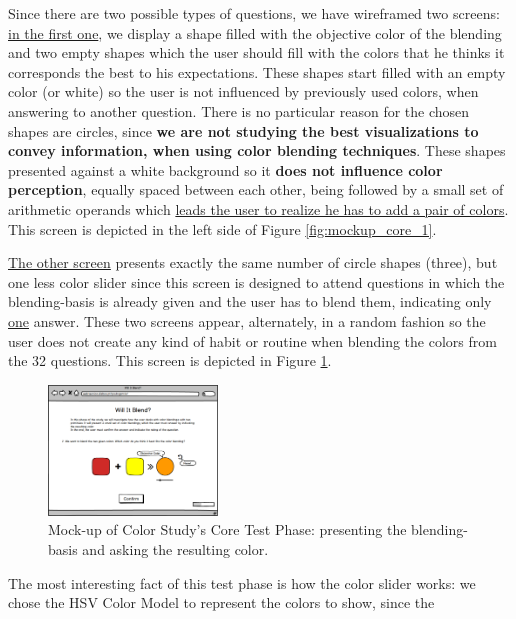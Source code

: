 %
Since there are two possible types of questions, we have wireframed two screens: \ul{in the first one}, we display a shape filled with the objective color of the
blending and two empty shapes which the user should fill with the colors that he thinks it corresponds the best to his expectations. These shapes start filled
with an empty color (or white) so the user is not influenced by previously used colors, when answering to another question. There is no particular reason for
the chosen shapes are circles, since \textbf{we are not studying the best visualizations to convey information, when using color blending techniques}. These
shapes presented against a white background so it \textbf{does not influence color perception}, equally spaced between each other, being followed by a small
set of arithmetic operands which \ul{leads the user to realize he has to add a pair of colors}. This screen is depicted in the left side of Figure
\ref{fig:mockup_core_1}. \par
%
\ul{The other screen} presents exactly the same number of circle shapes (three), but one less color slider since this screen is designed to attend questions in
which the blending-basis is already given and the user has to blend them, indicating only \ul{one} answer. These two screens appear, alternately, in a random
fashion so the user does not create any kind of habit or routine when blending the colors from the 32 questions. This screen is depicted in Figure
\ref{fig:mockup_core_2}. \par
%
\begin{figure}[htbp]
	\centering
  \includegraphics[width=0.4\textwidth]{images/implementation/mockup_core_twoColorsObj.png}
  \caption[Mock-up of Color Study's Core Test Phase: present the blending-basis and ask the result.]{Mock-up of Color Study's Core
	Test Phase: presenting the blending-basis and asking the resulting color.}
  \label{fig:mockup_core_2}
\end{figure} \par
%
The most interesting fact of this test phase is how the color slider works: we chose the HSV Color Model to represent the colors to show, since the
